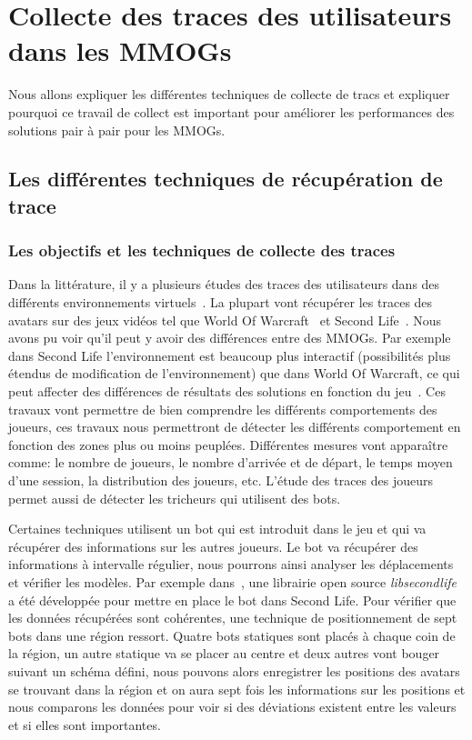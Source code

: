 \newpage
\section{Collecte des traces des utilisateurs dans les MMOGs}
	\label{trace}
	Nous allons expliquer les différentes techniques de collecte de tracs et expliquer pourquoi ce travail de collect est important pour améliorer les performances des solutions pair à pair pour les MMOGs.
	\subsection{Les différentes techniques de récupération de trace}
		\subsubsection{Les objectifs et les techniques de collecte des traces}
		\par Dans la littérature, il y a plusieurs études des traces des utilisateurs dans des différents environnements virtuels~\cite{1326262,0295-5075-88-4-48007}. La plupart vont récupérer les traces des avatars sur des jeux vidéos tel que World Of Warcraft~\cite{wow} et Second Life~\cite{sl}. Nous avons pu voir qu'il peut y avoir des différences entre des MMOGs. Par exemple dans Second Life l'environnement est beaucoup plus interactif (possibilités plus étendus de modification de l'environnement) que dans World Of Warcraft, ce qui peut affecter des différences de résultats des solutions en fonction du jeu~\cite{DBLP:journals/corr/abs-0807-2328,1613041}. Ces travaux vont permettre de bien comprendre les différents comportements des joueurs, ces travaux nous permettront de détecter les différents comportement en fonction des zones plus ou moins peuplées. Différentes mesures vont apparaître comme: le nombre de joueurs, le nombre d'arrivée et de départ, le temps moyen d'une session, la distribution des joueurs, etc. L'étude des traces des joueurs permet aussi de détecter les tricheurs qui utilisent des bots. \\
	\par Certaines techniques utilisent un bot qui est introduit dans le jeu et qui va récupérer des informations sur les autres joueurs. Le bot va récupérer des informations à intervalle régulier, nous pourrons ainsi analyser les déplacements et vérifier les modèles. Par exemple dans~\cite{DBLP:journals/corr/abs-0807-2328}, une librairie open source \textit{libsecondlife} a été développée pour mettre en place le bot dans Second Life. Pour vérifier que les données récupérées sont cohérentes, une technique de positionnement de sept bots dans une région ressort. Quatre bots statiques sont placés à chaque coin de la région, un autre statique va se placer au centre et deux autres vont bouger suivant un schéma défini, nous pouvons alors enregistrer les positions des avatars se trouvant dans la région et on aura sept fois les informations sur les positions et nous comparons les données pour voir si des déviations existent entre les valeurs et si elles sont importantes.\\  
